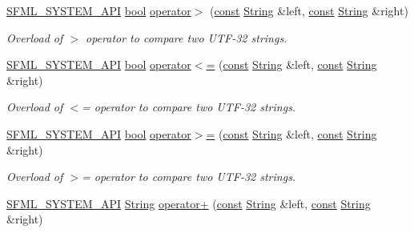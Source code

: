 \begin{DoxyCompactItemize}
\hyperlink{sfml_2dep_2_s_f_m_l-2_84_82_2include_2_s_f_m_l_2_system_2_export_8hpp_a6476c9e422606477a4c23d92b1d79a1f}{S\-F\-M\-L\-\_\-\-S\-Y\-S\-T\-E\-M\-\_\-\-A\-P\-I} \hyperlink{term__entry_8h_a002004ba5d663f149f6c38064926abac}{bool} \hyperlink{classsf_1_1_string_a5efc1eca58cf5c17d01eb8501d303538}{operator$>$} (\hyperlink{term__entry_8h_a57bd63ce7f9a353488880e3de6692d5a}{const} \hyperlink{classsf_1_1_string}{String} \&left, \hyperlink{term__entry_8h_a57bd63ce7f9a353488880e3de6692d5a}{const} \hyperlink{classsf_1_1_string}{String} \&right)
\begin{DoxyCompactList}\small\item\em Overload of $>$ operator to compare two U\-T\-F-\/32 strings. \end{DoxyCompactList}\item 
\hyperlink{sfml_2dep_2_s_f_m_l-2_84_82_2include_2_s_f_m_l_2_system_2_export_8hpp_a6476c9e422606477a4c23d92b1d79a1f}{S\-F\-M\-L\-\_\-\-S\-Y\-S\-T\-E\-M\-\_\-\-A\-P\-I} \hyperlink{term__entry_8h_a002004ba5d663f149f6c38064926abac}{bool} \hyperlink{classsf_1_1_string_abd342b6094b81cd086c7929b53b112ae}{operator$<$=} (\hyperlink{term__entry_8h_a57bd63ce7f9a353488880e3de6692d5a}{const} \hyperlink{classsf_1_1_string}{String} \&left, \hyperlink{term__entry_8h_a57bd63ce7f9a353488880e3de6692d5a}{const} \hyperlink{classsf_1_1_string}{String} \&right)
\begin{DoxyCompactList}\small\item\em Overload of $<$= operator to compare two U\-T\-F-\/32 strings. \end{DoxyCompactList}\item 
\hyperlink{sfml_2dep_2_s_f_m_l-2_84_82_2include_2_s_f_m_l_2_system_2_export_8hpp_a6476c9e422606477a4c23d92b1d79a1f}{S\-F\-M\-L\-\_\-\-S\-Y\-S\-T\-E\-M\-\_\-\-A\-P\-I} \hyperlink{term__entry_8h_a002004ba5d663f149f6c38064926abac}{bool} \hyperlink{classsf_1_1_string_a8d2979d7829d6616330a768956f251e1}{operator$>$=} (\hyperlink{term__entry_8h_a57bd63ce7f9a353488880e3de6692d5a}{const} \hyperlink{classsf_1_1_string}{String} \&left, \hyperlink{term__entry_8h_a57bd63ce7f9a353488880e3de6692d5a}{const} \hyperlink{classsf_1_1_string}{String} \&right)
\begin{DoxyCompactList}\small\item\em Overload of $>$= operator to compare two U\-T\-F-\/32 strings. \end{DoxyCompactList}\item 
\hyperlink{sfml_2dep_2_s_f_m_l-2_84_82_2include_2_s_f_m_l_2_system_2_export_8hpp_a6476c9e422606477a4c23d92b1d79a1f}{S\-F\-M\-L\-\_\-\-S\-Y\-S\-T\-E\-M\-\_\-\-A\-P\-I} \hyperlink{classsf_1_1_string}{String} \hyperlink{classsf_1_1_string_a55ef2bf7dc6b295ef7127b0bc1e58760}{operator+} (\hyperlink{term__entry_8h_a57bd63ce7f9a353488880e3de6692d5a}{const} \hyperlink{classsf_1_1_string}{String} \&left, \hyperlink{term__entry_8h_a57bd63ce7f9a353488880e3de6692d5a}{const} \hyperlink{classsf_1_1_string}{String} \&right)

\end{DoxyCompactItemize}

